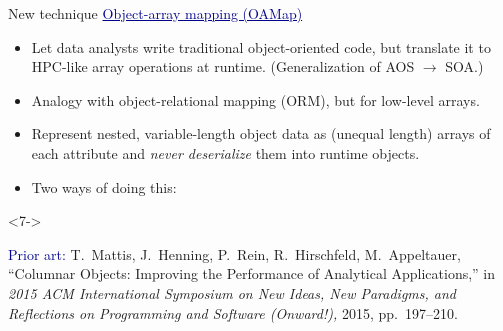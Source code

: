 \documentclass[aspectratio=169]{beamer}
\begin{document}
\begin{frame}{New technique}
\vspace{0.35 cm}
\textcolor{darkblue}{\large \underline{Object-array mapping (OAMap)}}

\vspace{0.15 cm}
\begin{itemize}\setlength{\itemsep}{0.15 cm}
\item Let data analysts write traditional object-oriented code, but translate it to HPC-like array operations at runtime. (Generalization of AOS $\to$ SOA.)
\item<2-> Analogy with object-relational mapping (ORM), but for low-level arrays.
\item<3-> Represent nested, variable-length object data as (unequal length) arrays of each attribute and {\it never deserialize} them into runtime objects.
\item<4-> Two ways of doing this:

\vspace{0.05 cm}
\end{itemize}

\vspace{0.2 cm}
\begin{uncoverenv}<7->
\begin{minipage}{\linewidth}
\scriptsize \textcolor{darkblue}{Prior art:} T.\ Mattis, J.\ Henning, P.\ Rein, R.\ Hirschfeld, M.\ Appeltauer, ``Columnar Objects: Improving the Performance of Analytical Applications,'' in {\it 2015 ACM International Symposium on New Ideas, New Paradigms, and Reflections on Programming and Software (Onward!),} 2015, pp.\ 197--210.
\end{minipage}
\end{uncoverenv}
\end{frame}
\end{document}

